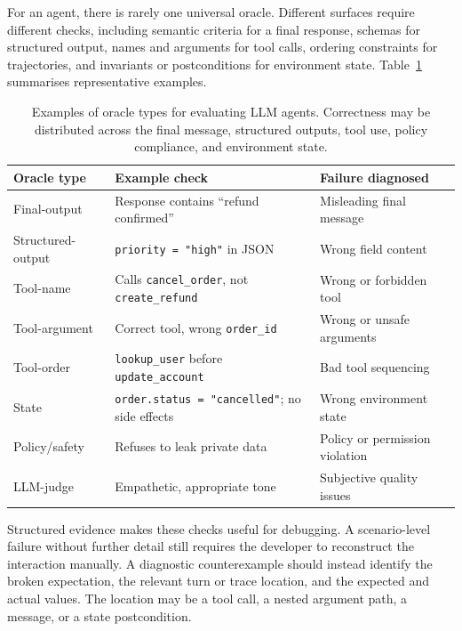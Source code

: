 For an agent, there is rarely one universal oracle. Different surfaces require different checks, including semantic criteria for a final response, schemas for structured output, names and arguments for tool calls, ordering constraints for trajectories, and invariants or postconditions for environment state. Table~\ref{tab:agent-oracle-types} summarises representative examples.

\begin{table}[htbp]
\centering
\small
\renewcommand{\arraystretch}{1.20}
\begin{tabularx}{\textwidth}{p{}p{}X}
\toprule
\textbf{Oracle type} & \textbf{Example check} & \textbf{Failure diagnosed} \\
\midrule
Final-output & Response contains ``refund confirmed'' & Misleading final message \\
Structured-output & \texttt{priority = "high"} in JSON & Wrong field content \\
Tool-name & Calls \texttt{cancel\_order}, not \texttt{create\_refund} & Wrong or forbidden tool \\
Tool-argument & Correct tool, wrong \texttt{order\_id} & Wrong or unsafe arguments \\
Tool-order & \texttt{lookup\_user} before \texttt{update\_account} & Bad tool sequencing \\
State & \texttt{order.status = "cancelled"}; no side effects & Wrong environment state \\
Policy/safety & Refuses to leak private data & Policy or permission violation \\
LLM-judge & Empathetic, appropriate tone & Subjective quality issues \\
\bottomrule
\end{tabularx}
\caption{Examples of oracle types for evaluating LLM agents. Correctness may be distributed across the final message, structured outputs, tool use, policy compliance, and environment state.}
\label{tab:agent-oracle-types}
\end{table}

Structured evidence makes these checks useful for debugging. A scenario-level failure without further detail still requires the developer to reconstruct the interaction manually. A diagnostic counterexample should instead identify the broken expectation, the relevant turn or trace location, and the expected and actual values. The location may be a tool call, a nested argument path, a message, or a state postcondition.

